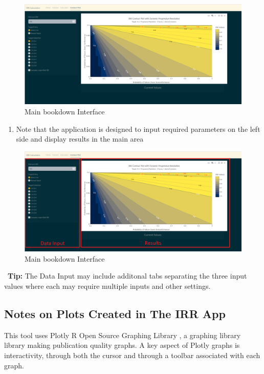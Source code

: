 \documentclass[
]{article}
\providecommand{\tightlist}{%
  \setlength{\itemsep}{0pt}\setlength{\parskip}{0pt}}
\begin{document}
\begin{figure}

{\centering \includegraphics[width=0.5\linewidth]{Design Space Explorer} 

}

\caption{Main bookdown Interface}\label{fig:unnamed-chunk-11}
\end{figure}

\begin{enumerate}
\def\labelenumi{\arabic{enumi}.}
\setcounter{enumi}{2}
\tightlist
\item
  Note that the application is designed to input required parameters on the left side and display results in the main area
\end{enumerate}

\begin{figure}

{\centering \includegraphics[width=0.5\linewidth]{Page Layout} 

}

\caption{Main bookdown Interface}\label{fig:unnamed-chunk-12}
\end{figure}
\begin{tipbox}
\faLightbulb\ \textbf{Tip:} The Data Input may include additonal tabs separating the three input values where each may require multiple inputs and other settings.
\end{tipbox}

\subsection{Notes on Plots Created in The IRR App}\label{notes-on-plots-created-in-the-irr-app}

This tool uses Plotly R Open Source Graphing Library \citep{plotly}, a graphing library library making publication quality graphs. A key aspect of Plotly graphs is interactivity, through both the cursor and through a toolbar associated with each graph.
\end{document}
